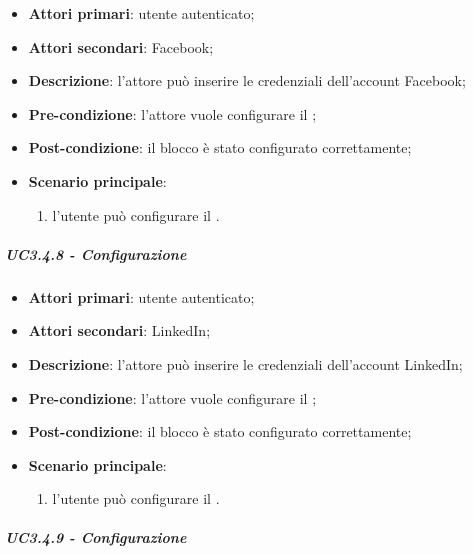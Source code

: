 \begin{itemize}
\item \textbf{Attori primari}: utente autenticato;

\item \textbf{Attori secondari}: Facebook;

\item \textbf{Descrizione}: l'attore può inserire le credenziali dell'account Facebook;

\item \textbf{Pre-condizione}: l'attore vuole configurare il \BMessenger{};

\item \textbf{Post-condizione}:  il blocco è stato configurato correttamente;

\item \textbf{Scenario principale}:
\begin{enumerate}
\item  l'utente può configurare il \BMessenger{}.

\end{enumerate}
\end{itemize}

\subparagraph{UC3.4.8 - Configurazione \BLinkedIn{}}

\begin{itemize}
\item \textbf{Attori primari}: utente autenticato;

\item \textbf{Attori secondari}: LinkedIn;

\item \textbf{Descrizione}: l'attore può inserire le credenziali dell'account LinkedIn;

\item \textbf{Pre-condizione}: l'attore vuole configurare il \BLinkedIn{};

\item \textbf{Post-condizione}:  il blocco è stato configurato correttamente;

\item \textbf{Scenario principale}:
\begin{enumerate}
\item  l'utente può configurare il \BLinkedIn{}.

\end{enumerate}
\end{itemize}

\subparagraph{UC3.4.9 - Configurazione \BSveglia{}}

